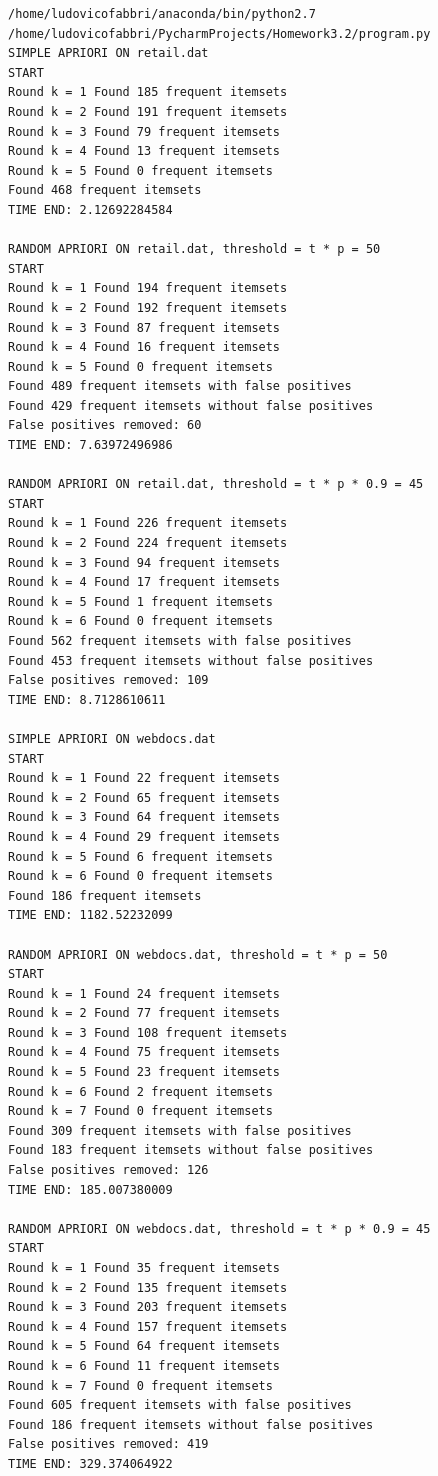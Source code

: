 \documentclass{article}
\begin{document}
\begin{lstlisting} 
/home/ludovicofabbri/anaconda/bin/python2.7 /home/ludovicofabbri/PycharmProjects/Homework3.2/program.py
SIMPLE APRIORI ON retail.dat
START
Round k = 1 Found 185 frequent itemsets
Round k = 2 Found 191 frequent itemsets
Round k = 3 Found 79 frequent itemsets
Round k = 4 Found 13 frequent itemsets
Round k = 5 Found 0 frequent itemsets
Found 468 frequent itemsets
TIME END: 2.12692284584

RANDOM APRIORI ON retail.dat, threshold = t * p = 50
START
Round k = 1 Found 194 frequent itemsets
Round k = 2 Found 192 frequent itemsets
Round k = 3 Found 87 frequent itemsets
Round k = 4 Found 16 frequent itemsets
Round k = 5 Found 0 frequent itemsets
Found 489 frequent itemsets with false positives
Found 429 frequent itemsets without false positives
False positives removed: 60
TIME END: 7.63972496986

RANDOM APRIORI ON retail.dat, threshold = t * p * 0.9 = 45
START
Round k = 1 Found 226 frequent itemsets
Round k = 2 Found 224 frequent itemsets
Round k = 3 Found 94 frequent itemsets
Round k = 4 Found 17 frequent itemsets
Round k = 5 Found 1 frequent itemsets
Round k = 6 Found 0 frequent itemsets
Found 562 frequent itemsets with false positives
Found 453 frequent itemsets without false positives
False positives removed: 109
TIME END: 8.7128610611

SIMPLE APRIORI ON webdocs.dat
START
Round k = 1 Found 22 frequent itemsets
Round k = 2 Found 65 frequent itemsets
Round k = 3 Found 64 frequent itemsets
Round k = 4 Found 29 frequent itemsets
Round k = 5 Found 6 frequent itemsets
Round k = 6 Found 0 frequent itemsets
Found 186 frequent itemsets
TIME END: 1182.52232099

RANDOM APRIORI ON webdocs.dat, threshold = t * p = 50
START
Round k = 1 Found 24 frequent itemsets
Round k = 2 Found 77 frequent itemsets
Round k = 3 Found 108 frequent itemsets
Round k = 4 Found 75 frequent itemsets
Round k = 5 Found 23 frequent itemsets
Round k = 6 Found 2 frequent itemsets
Round k = 7 Found 0 frequent itemsets
Found 309 frequent itemsets with false positives
Found 183 frequent itemsets without false positives
False positives removed: 126
TIME END: 185.007380009

RANDOM APRIORI ON webdocs.dat, threshold = t * p * 0.9 = 45
START
Round k = 1 Found 35 frequent itemsets
Round k = 2 Found 135 frequent itemsets
Round k = 3 Found 203 frequent itemsets
Round k = 4 Found 157 frequent itemsets
Round k = 5 Found 64 frequent itemsets
Round k = 6 Found 11 frequent itemsets
Round k = 7 Found 0 frequent itemsets
Found 605 frequent itemsets with false positives
Found 186 frequent itemsets without false positives
False positives removed: 419
TIME END: 329.374064922


\end{lstlisting}
\end{document}
